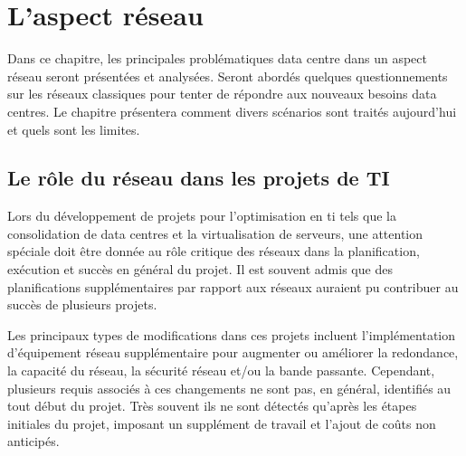 


\chapter{L'aspect réseau}
Dans ce chapitre, les principales problématiques data centre dans un aspect réseau seront présentées et analysées. Seront abordés quelques questionnements sur les réseaux classiques pour tenter de répondre aux nouveaux besoins data centres. Le chapitre présentera comment divers scénarios sont traités aujourd'hui et quels sont les limites. 


\section{Le rôle du réseau dans les projets de TI}

Lors du développement de projets pour l'optimisation en \gls{ti} tels que la consolidation de data centres et la virtualisation de serveurs, une attention spéciale doit être donnée au rôle critique des réseaux dans la planification, exécution et succès en général du projet. Il est souvent admis que des planifications supplémentaires par rapport aux réseaux auraient pu contribuer au succès de plusieurs projets.



Les principaux types de modifications dans ces projets incluent l'implémentation d'équipement réseau supplémentaire pour augmenter ou améliorer la redondance, la capacité du réseau, la sécurité réseau et/ou la bande passante. Cependant, plusieurs requis associés à ces changements ne sont pas, en général, identifiés au tout début du projet. Très souvent ils ne sont détectés qu'après les étapes initiales du projet, imposant un supplément de travail et l'ajout de coûts non anticipés.



